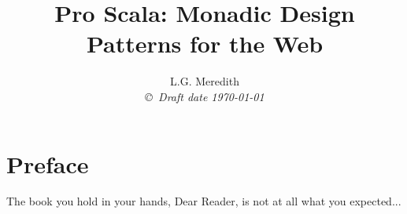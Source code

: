\documentclass[12pt,leqno]{book}
\title{Pro Scala: Monadic Design Patterns for the Web}
\author{L.G. Meredith  \\
{\small\em \copyright \  Draft date \today }}
\date{ }
\begin{document}
\maketitle
\tableofcontents
\listoffigures
\listoftables
\chapter*{Preface}\normalsize
\pagestyle{plain}





The book you hold in your hands, Dear Reader, is not at all what you expected...



\pagestyle{headings}














%
\end{document}
